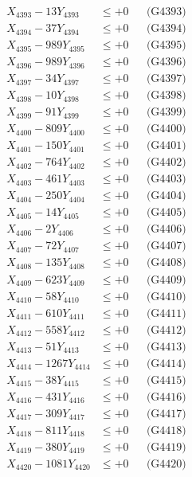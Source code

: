\documentclass[a4paper,10pt]{article}
\begin{document}
{\begin{align}
X_{4393} - 13Y_{4393} &\leq +0 && \text{(G4393)} \\
X_{4394} - 37Y_{4394} &\leq +0 && \text{(G4394)} \\
X_{4395} - 989Y_{4395} &\leq +0 && \text{(G4395)} \\
X_{4396} - 989Y_{4396} &\leq +0 && \text{(G4396)} \\
X_{4397} - 34Y_{4397} &\leq +0 && \text{(G4397)} \\
X_{4398} - 10Y_{4398} &\leq +0 && \text{(G4398)} \\
X_{4399} - 91Y_{4399} &\leq +0 && \text{(G4399)} \\
X_{4400} - 809Y_{4400} &\leq +0 && \text{(G4400)} \\
\allowbreak
X_{4401} - 150Y_{4401} &\leq +0 && \text{(G4401)} \\
X_{4402} - 764Y_{4402} &\leq +0 && \text{(G4402)} \\
X_{4403} - 461Y_{4403} &\leq +0 && \text{(G4403)} \\
X_{4404} - 250Y_{4404} &\leq +0 && \text{(G4404)} \\
X_{4405} - 14Y_{4405} &\leq +0 && \text{(G4405)} \\
X_{4406} - 2Y_{4406} &\leq +0 && \text{(G4406)} \\
X_{4407} - 72Y_{4407} &\leq +0 && \text{(G4407)} \\
X_{4408} - 135Y_{4408} &\leq +0 && \text{(G4408)} \\
X_{4409} - 623Y_{4409} &\leq +0 && \text{(G4409)} \\
X_{4410} - 58Y_{4410} &\leq +0 && \text{(G4410)} \\
\allowbreak
X_{4411} - 610Y_{4411} &\leq +0 && \text{(G4411)} \\
X_{4412} - 558Y_{4412} &\leq +0 && \text{(G4412)} \\
X_{4413} - 51Y_{4413} &\leq +0 && \text{(G4413)} \\
X_{4414} - 1267Y_{4414} &\leq +0 && \text{(G4414)} \\
X_{4415} - 38Y_{4415} &\leq +0 && \text{(G4415)} \\
X_{4416} - 431Y_{4416} &\leq +0 && \text{(G4416)} \\
X_{4417} - 309Y_{4417} &\leq +0 && \text{(G4417)} \\
X_{4418} - 811Y_{4418} &\leq +0 && \text{(G4418)} \\
X_{4419} - 380Y_{4419} &\leq +0 && \text{(G4419)} \\
X_{4420} - 1081Y_{4420} &\leq +0 && \text{(G4420)} \\

\end{align}}
\end{document}
